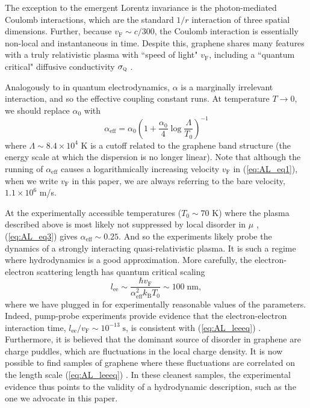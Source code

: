 The exception to the emergent Lorentz invariance is the photon-mediated Coulomb interactions, which are the standard $1/r$ interaction of three spatial dimensions.   Further, because $v_{\mathrm{F}} \sim c/300$,  the Coulomb interaction is essentially non-local and instantaneous in time.   Despite this,  graphene shares many features with a truly relativistic plasma with ``speed of light" $v_{\mathrm{F}}$, including a ``quantum critical" diffusive conductivity $\sigma_{\textsc{q}}$ \cite{muller_quantum-critical_2008}.

Analogously to in quantum electrodynamics, $\alpha$ is a marginally irrelevant interaction, and so the effective coupling constant runs.   At temperature $T\rightarrow 0$, we should replace $\alpha_0$ with \cite{sheehy_quantum_2007} \begin{equation}
\alpha_{\mathrm{eff}} = \alpha_0 \left(1+\frac{\alpha_0}{4}\log\frac{\Lambda}{T_0}\right)^{-1} \label{eq:AL_eq3}
\end{equation}
where $\Lambda \sim 8.4\times 10^4$ K is a cutoff related to the graphene band structure (the energy scale at which the dispersion is no longer linear).  Note that although the running of $\alpha_{\mathrm{eff}}$ causes a logarithmically increasing velocity $v_{\mathrm{F}}$ in (\ref{eq:AL_eq1}), when we write $v_{\mathrm{F}}$ in this paper, we are always referring to the bare velocity, $1.1\times 10^6$ m/s.    

At the experimentally accessible temperatures ($T_0\sim 70$ K) where the plasma described above is most likely not suppressed by local disorder in $\mu$ \cite{crossno_observation_2016},  (\ref{eq:AL_eq3}) gives $\alpha_{\mathrm{eff}} \sim 0.25$.    And so the experiments likely probe the dynamics of a strongly interacting quasi-relativistic plasma.   It is such a regime where hydrodynamics is a good approximation.   More carefully, the electron-electron scattering length has quantum critical scaling \cite{muller_quantum-critical_2008} \begin{equation}
l_{\mathrm{ee}} \sim \frac{\hbar v_{\mathrm{F}}}{\alpha_{\mathrm{eff}}^2 k_{\mathrm{B}}T_0} \sim 100 \; \mathrm{nm},  \label{eq:AL_leeeq}
\end{equation}
where we have plugged in for experimentally reasonable values of the parameters.   Indeed, pump-probe experiments provide evidence that the electron-electron interaction time,  $l_{\mathrm{ee}}/v_{\mathrm{F}} \sim 10^{-13} \; \mathrm{s}$, is consistent with (\ref{eq:AL_leeeq}) \cite{breusing_ultrafast_2009, johannsen_direct_2013}.   Furthermore, it is believed that the dominant source of disorder in graphene are charge puddles, which are fluctuations in the local charge density.   It is now possible to find samples of graphene where these fluctuations are correlated on the length scale (\ref{eq:AL_leeeq}) \cite{xue_scanning_2011}.   In these cleanest samples, the experimental evidence thus points to the validity of a hydrodynamic description, such as the one we advocate in this paper.


